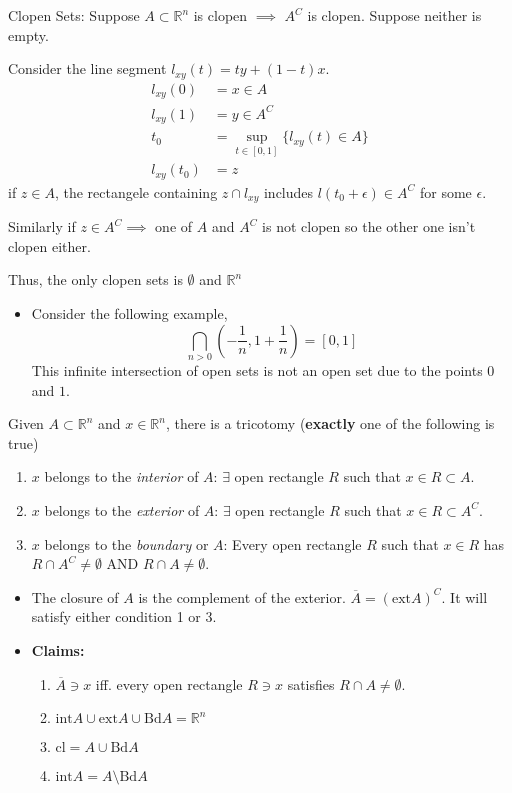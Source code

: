 \documentclass[a4paper]{article}
\numberwithin{equation}{section}
\newcommand{\R}{\mathbb{R}}
\begin{document}
\begin{definition}
Clopen Sets:
    Suppose $A\subset\R^n$ is clopen $\implies$ $A^C$ is clopen. Suppose neither is empty. 

    Consider the line segment $l_{xy}(t)=ty+(1-t)x$.
    \begin{align}
        l_{xy}(0)&=x\in A\\
        l_{xy}(1)&=y\in A^C\\
        t_0&=\sup_{t\in[0,1]}\{l_{xy}(t)\in A\}\\
        l_{xy}(t_0)&=z
    \end{align}
    if $z\in A$, the rectangele containing $z\cap l_{xy}$ includes $l(t_0+\epsilon)\in A^C$ for some $\epsilon$.

    Similarly if $z\in A^C\implies$ one of $A$ and $A^C$ is not clopen so the other one isn't clopen either. 

    Thus, the only clopen sets is $\emptyset$ and $\R^n$
\end{definition}
\begin{itemize}
    \item Consider the following example,
    \begin{equation}
        \bigcap_{n>0}\left(-\frac{1}{n},1+\frac{1}{n}\right)=[0,1]
    \end{equation}
    This infinite intersection of open sets is not an open set due to the points $0$ and $1$.
\end{itemize}
\begin{definition}
    Given $A\subset\R^n$ and $x\in\R^n$, there is a tricotomy (\textbf{exactly} one of the following is true)
    \begin{enumerate}
        \item $x$ belongs to the \textit{interior} of $A$: $\exists$ open rectangle $R$ such that $x\in R\subset A$.
        \item $x$ belongs to the \textit{exterior} of $A$: $\exists$ open rectangle $R$ such that $x\in R\subset A^C$.
        \item $x$ belongs to the \textit{boundary} or $A$: Every open rectangle $R$ such that $x\in R$ has $R\cap A^C\neq\emptyset$ AND $R\cap A\neq\emptyset$.
    \end{enumerate}
    \begin{itemize}
        \item The closure of $A$ is the complement of the exterior. $\overline{A} = (\mathrm{ext} A)^C$. It will satisfy either condition 1 or 3.
        \item \textbf{Claims: } 
        \begin{enumerate}
            \item $\overline A\ni x$ iff. every open rectangle $R\ni x$ satisfies $R\cap A\neq\emptyset$.
            \item $\mathrm{int} A\cup\mathrm{ext} A\cup \mathrm{Bd} A=\R^n$
            \item $\mathrm{cl} = A\cup\mathrm{Bd} A$
            \item $\mathrm{int} A=A\setminus \mathrm{Bd}A$
        \end{enumerate}
    \end{itemize}
\end{definition}
\end{document}

